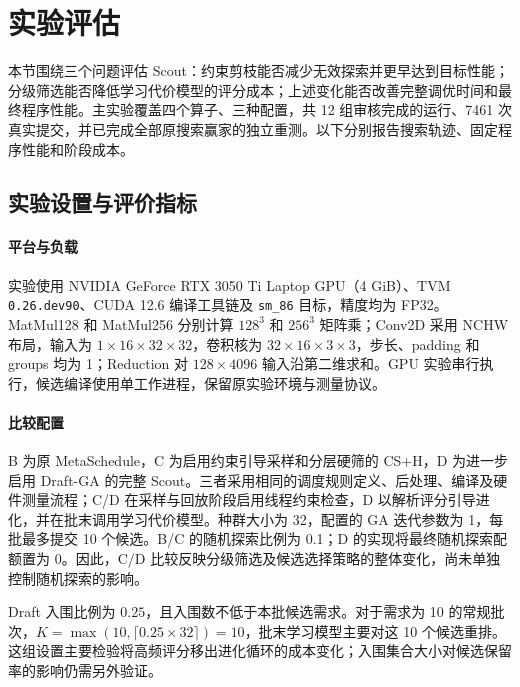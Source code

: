 \begingroup
\renewcommand{\dbltopfraction}{0.92}
\renewcommand{\textfraction}{0.08}
\renewcommand{\dblfloatpagefraction}{0.65}
\makeatletter
\setlength{\@dblfptop}{0pt}
\setlength{\@dblfpsep}{12pt}
\setlength{\@dblfpbot}{0pt plus 1fil}
\makeatother
\raggedbottom
\section{实验评估}
\label{sec:evaluation}
本节围绕三个问题评估 Scout：约束剪枝能否减少无效探索并更早达到目标性能；分级筛选能否降低学习代价模型的评分成本；上述变化能否改善完整调优时间和最终程序性能。主实验覆盖四个算子、三种配置，共 12 组审核完成的运行、7461 次真实提交，并已完成全部原搜索赢家的独立重测。以下分别报告搜索轨迹、固定程序性能和阶段成本。

\subsection{实验设置与评价指标}
\label{sec:experiment-setup}
\paragraph{平台与负载}
实验使用 NVIDIA GeForce RTX 3050 Ti Laptop GPU（4 GiB）、TVM \texttt{0.26.dev90}、CUDA 12.6 编译工具链及 \texttt{sm\_86} 目标，精度均为 FP32。MatMul128 和 MatMul256 分别计算 $128^3$ 和 $256^3$ 矩阵乘；Conv2D 采用 NCHW 布局，输入为 $1\times16\times32\times32$，卷积核为 $32\times16\times3\times3$，步长、padding 和 groups 均为 1；Reduction 对 $128\times4096$ 输入沿第二维求和。GPU 实验串行执行，候选编译使用单工作进程，保留原实验环境与测量协议。

\paragraph{比较配置}
B 为原 MetaSchedule，C 为启用约束引导采样和分层硬筛的 CS+H，D 为进一步启用 Draft-GA 的完整 Scout。三者采用相同的调度规则定义、后处理、编译及硬件测量流程；C/D 在采样与回放阶段启用线程约束检查，D 以解析评分引导进化，并在批末调用学习代价模型。种群大小为 32，配置的 GA 迭代参数为 1，每批最多提交 10 个候选。B/C 的随机探索比例为 0.1；D 的实现将最终随机探索配额置为 0。因此，C/D 比较反映分级筛选及候选选择策略的整体变化，尚未单独控制随机探索的影响。

Draft 入围比例为 $0.25$，且入围数不低于本批候选需求。对于需求为 10 的常规批次，$K=\max(10,\lceil0.25\times32\rceil)=10$，批末学习模型主要对这 10 个候选重排。这组设置主要检验将高频评分移出进化循环的成本变化；入围集合大小对候选保留率的影响仍需另外验证。

